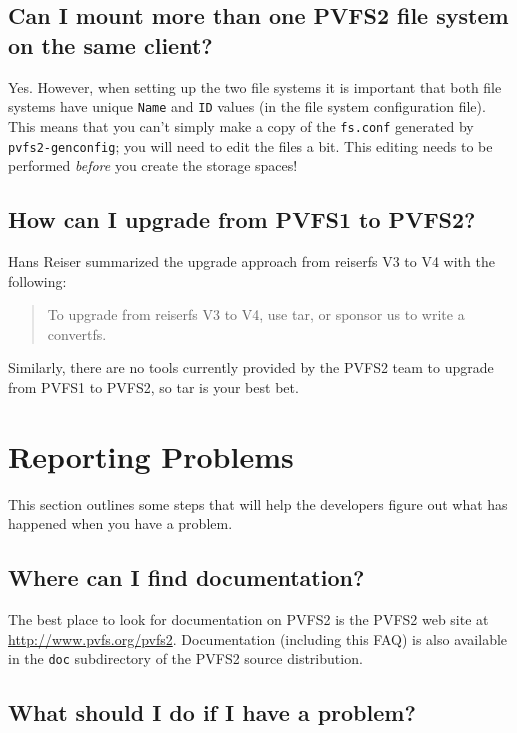 \documentclass[11pt,letterpaper]{article}
\begin{document}
\subsection{Can I mount more than one PVFS2 file system on the same client?}
\label{sec:multiple-mounts}

Yes.  However, when setting up the two file systems it is important that both
file systems have unique \texttt{Name} and \texttt{ID} values (in the
file system configuration file).  This means that you can't simply make a copy
of the \texttt{fs.conf} generated by \texttt{pvfs2-genconfig}; you will need
to edit the files a bit.  This editing needs to be performed \emph{before} you
create the storage spaces!

\subsection{How can I upgrade from PVFS1 to PVFS2?}

Hans Reiser summarized the upgrade approach from reiserfs V3 to V4 with the following:
\begin{quote}
To upgrade from reiserfs V3 to V4, use tar, or sponsor us to write a convertfs.
\end{quote}
Similarly, there are no tools currently provided by the PVFS2 team to
upgrade from PVFS1 to PVFS2, so tar is your best bet.

%
%
\section{Reporting Problems}

This section outlines some steps that will help the developers figure out what
has happened when you have a problem.

\subsection{Where can I find documentation?}

The best place to look for documentation on PVFS2 is the PVFS2 web site at
\url{http://www.pvfs.org/pvfs2}.  Documentation (including this FAQ) is also
available in the \texttt{doc} subdirectory of the PVFS2 source distribution.

\subsection{What should I do if I have a problem?}
\end{document}
